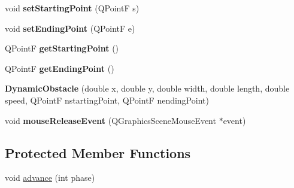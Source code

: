 \begin{DoxyCompactItemize}
void {\bfseries set\+Starting\+Point} (Q\+PointF s)
\item 
\mbox{\label{class_dynamic_obstacle_a17645d997a7c2a7deaf5fe4726421097}} 
void {\bfseries set\+Ending\+Point} (Q\+PointF e)
\item 
\mbox{\label{class_dynamic_obstacle_ad2eb80be1ef5df9f1ff70d200751c818}} 
Q\+PointF {\bfseries get\+Starting\+Point} ()
\item 
\mbox{\label{class_dynamic_obstacle_a6f51781c092dee7eeed1de6bb588b9ba}} 
Q\+PointF {\bfseries get\+Ending\+Point} ()
\item 
\mbox{\label{class_dynamic_obstacle_a8dc5e893aa21f59e0b8ca4a9035612ea}} 
{\bfseries Dynamic\+Obstacle} (double x, double y, double width, double length, double speed, Q\+PointF nstarting\+Point, Q\+PointF nending\+Point)
\item 
\mbox{\label{class_dynamic_obstacle_a3d2a49ec759253b9035954ecf8de9123}} 
void {\bfseries mouse\+Release\+Event} (Q\+Graphics\+Scene\+Mouse\+Event $\ast$event)
\end{DoxyCompactItemize}
\subsection*{Protected Member Functions}
\begin{DoxyCompactItemize}
\item 
void \mbox{\hyperlink{class_dynamic_obstacle_a533d0927fbe09aa105c47e00b1cd045f}{advance}} (int phase)
\end{DoxyCompactItemize}
